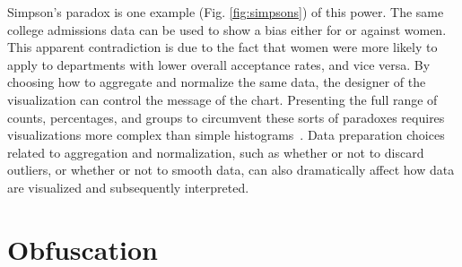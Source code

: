 \documentclass{vgtc}                          %
\begin{document}
Simpson's paradox is one example (Fig. \ref{fig:simpsons}) of this power. The same college admissions data can be used to show a bias either for or against women. This apparent contradiction is due to the fact that women were more likely to apply to departments with lower overall acceptance rates, and vice versa. By choosing how to aggregate and normalize the same data, the designer of the visualization can control the message of the chart. Presenting the full range of counts, percentages, and groups to circumvent these sorts of paradoxes requires visualizations more complex than simple histograms~\cite{poco2018extracting}. Data preparation choices related to aggregation and normalization, such as whether or not to discard outliers, or whether or not to smooth data, can also dramatically affect how data are visualized and subsequently interpreted.

\section{Obfuscation}
\end{document}
